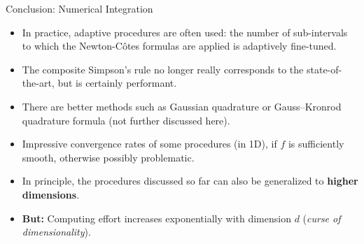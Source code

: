 \documentclass[11pt,compress,t,notes=noshow, xcolor=table]{beamer}
\begin{document}
\begin{vbframe}{Conclusion: Numerical Integration}

\begin{itemize}
  \item In practice, adaptive procedures are often used: the number of sub-intervals to which the Newton-C\^{o}tes formulas are applied is adaptively fine-tuned.
\item The composite Simpson's rule no longer really corresponds to the state-of-the-art, but is certainly
  performant.

  \item There are better methods such as Gaussian quadrature or Gauss–Kronrod quadrature formula
    (not further discussed here).

  \item Impressive convergence rates of some procedures (in 1D), if
    $f$ is sufficiently smooth, otherwise possibly problematic.

\item In principle, the procedures discussed so far can also be generalized to \textbf{higher dimensions}.
\item \textbf{But:} Computing effort increases exponentially with dimension $d$ (\textit{curse of dimensionality}).
\end{itemize}


\end{vbframe}


\endlecture
\end{document}
